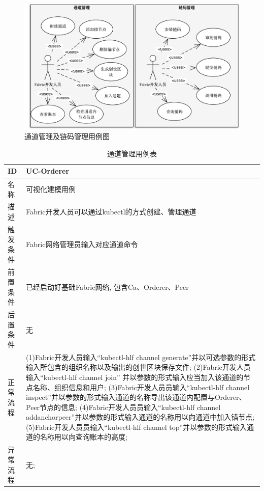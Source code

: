 \begin{figure}[!htbp] %
    \centering %
    \includegraphics[width=1.0\textwidth]{FIGs/chapter4/chan_cc_use_case.pdf} %
    \caption{通道管理及链码管理用例图} %
    \label{chan_cc_use_case} %
\end{figure}%


{\footnotesize
\begin{longtable}[h]{m{60pt}|m{280pt}}
    \caption[通道管理用例表]{通道管理用例表} \label{chan_use_case} \\
        \hline  
        ID&UC-Orderer\\
        \hline
        名称&可视化建模用例\\
        \hline
        描述&Fabric开发人员可以通过kubectl的方式创建、管理通道\\
        \hline
        触发条件&Fabric网络管理员输入对应通道命令\\
        \hline
        前置条件&已经启动好基础Fabric网络, 包含Ca、Orderer、Peer\\
        \hline
        后置条件&无\\
        \hline
        正常流程& (1)Fabric开发人员输入“kubectl-hlf channel generate”并以可选参数的形式输入所包含的组织名称以及输出的创世区块保存文件;
        \newline (2)Fabric开发人员输入“kubectl-hlf channel join” 并以参数的形式输入应当加入该通道的节点名称、组织信息和用户;
        \newline (3)Fabric开发人员员输入“kubectl-hlf channel inspect”并以参数的形式输入通道的名称导出该通道内配置与Orderer、Peer节点的信息;
        \newline (4)Fabric开发人员员输入“kubectl-hlf channel addanchorpeer”并以参数的形式输入通道的名称用以向通道中加入锚节点;
        \newline (5)Fabric开发人员员输入“kubectl-hlf channel top”并以参数的形式输入通道的名称用以向查询账本的高度;\\
        \hline 
        异常流程& 无; \\
        \hline
    \end{longtable} 
}


